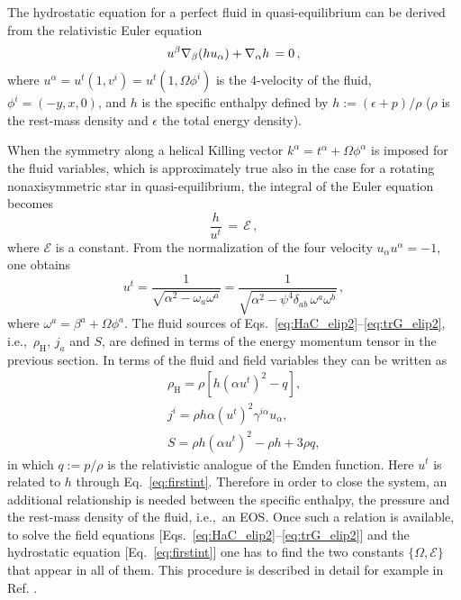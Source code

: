 \documentclass[twocolumn,superscriptaddress,showpacs,prd,aps,amsmath,amssymb,nofootinbib]{revtex4-1}
\newcommand{\ie}{i.e.,~}
\begin{document}
The hydrostatic equation for a perfect fluid in quasi-equilibrium can be
derived from the relativistic Euler equation \cite{Rezzolla_book:2013}
%
\begin{equation}
u^\beta \nabla_\beta(hu_\alpha) + \nabla_\alpha h\,=0\,, 
\end{equation}
%
where $u^\alpha=u^t(1,v^i)=u^t(1,\Omega\phi^i)$ is the 4-velocity of the
fluid, $\phi^i=(-y,x,0)$, and $h$ is the specific enthalpy defined by
$h:=(\epsilon+p)/\rho$ ($\rho$ is the rest-mass density and
$\epsilon$ the total energy density).

When the symmetry along a helical Killing vector $k^\alpha=t^\alpha +
\Omega \phi^\alpha$ is imposed for the fluid variables, which is
approximately true also in the case for a rotating nonaxisymmetric star
in quasi-equilibrium, the integral of the Euler equation becomes
\begin{equation}
\frac{h}{u^t}\,=\, \mathcal{E}\, ,
\label{eq:firstint}
\end{equation}
where $\mathcal{E}$ is a constant. From the normalization of the four
velocity $u_\alpha u^\alpha=-1$, one obtains
\begin{equation}
u^t = \frac1{\sqrt{\alpha^2 - \omega_a \omega^a}}
= \frac1{\sqrt{\alpha^2 - \psi^4 \delta_{ab}\,\omega^a \omega^b}}\,, 
\label{eq:ut}
\end{equation}
where $\omega^a = \beta^a + \Omega \phi^a$.  The fluid sources of
Eqs.~\eqref{eq:HaC_elip2}--\ref{eq:trG_elip2}, \ie $\rho_{\mathrm{H}}$,
$j_a$ and $S$, are defined in terms of the energy momentum tensor in the
previous section.  In terms of the fluid and field variables they can be
written as \cite{Rezzolla_book:2013}
%
\begin{eqnarray}
&&\rho_{\mathrm{H}}=\rho[h(\alpha u^t)^2-q],   \label{eq:rhoh}\\
&& j^i=\rho h\alpha(u^t)^2\gamma^{i\alpha} u_\alpha,  \label{eq:ja}\\
&& S=\rho h (\alpha u^t)^2 - \rho h +3\rho q,  \label{eq:s}
\end{eqnarray}
in which $q:=p/\rho$ is the relativistic analogue of the Emden function.
Here $u^t$ is related to $h$ through
Eq.~\eqref{eq:firstint}. Therefore in order to close the
system, an additional relationship is needed between the specific
enthalpy, the pressure and the rest-mass density of the fluid, \ie an
EOS. Once such a relation is available, to solve the field equations
[Eqs.~\eqref{eq:HaC_elip2}--\ref{eq:trG_elip2}] and the hydrostatic
equation [Eq.~\eqref{eq:firstint}] one has to find the two constants
$\{\Omega,\mathcal{E}\}$ that appear in all of them. This procedure is
described in detail for example in Ref. \cite{Tsokaros2015}.
\end{document}
